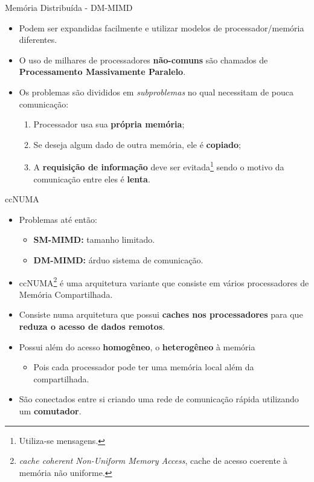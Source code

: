 \begin{frame}{Memória Distribuída - DM-MIMD}
	\begin{itemize}
		\item Podem ser expandidas facilmente e utilizar modelos de processador/memória diferentes.
		\item O uso de milhares de processadores \textbf{não-comuns} são chamados de \textbf{Processamento Massivamente Paralelo}.
		\item Os problemas são divididos em \textit{subproblemas} no qual necessitam de pouca comunicação:
		\begin{enumerate}
			\item Processador usa sua \textbf{própria memória};
			\item Se deseja algum dado de outra memória, ele é \textbf{copiado};
			\item A \textbf{requisição de informação} deve ser evitada\footnote{Utiliza-se mensagens.} sendo o motivo da comunicação entre eles é \textbf{lenta}.
		\end{enumerate}

	\end{itemize}

\end{frame}








\begin{frame}{ccNUMA}
	\begin{itemize}
		\item Problemas até então:
			\begin{itemize}
				\item {\bf SM-MIMD:} tamanho limitado.
				\item {\bf DM-MIMD:} árduo sistema de comunicação.
			\end{itemize}

				\bigskip

		\item ccNUMA\footnote{\textit{cache coherent Non-Uniform Memory Access}, cache de acesso coerente à memória não uniforme.} é uma arquitetura variante que consiste em vários processadores de Memória Compartilhada.
		\item Consiste numa arquitetura que possui \textbf{caches nos processadores} para que {\bf reduza o acesso de dados remotos}.

		\item Possui além do acesso {\bf homogêneo}, o {\bf heterogêneo}  à memória
		\begin{itemize}
			\item Pois cada processador pode ter uma memória local além da compartilhada.
		\end{itemize}
		\item São conectados entre si criando uma rede de comunicação rápida utilizando um {\bf comutador}.
	\end{itemize}

\end{frame}


